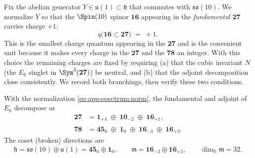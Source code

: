 Fix the abelian generator $Y\in\mathfrak u(1)\subset\mathfrak h$ that
commutes with $\mathfrak{so}(10)$. We normalize $Y$ so that the
$\Spin(10)$ spinor $\mathbf{16}$ appearing in the \emph{fundamental}
$\mathbf{27}$ carries charge $+1$:
\begin{equation}
  q\bigl(\mathbf{16}\subset\mathbf{27}\bigr) \;=\; +1 .
  \label{eq:app-spectrum:norm}
\end{equation}
This is the smallest charge quantum appearing in the $\mathbf{27}$ and
is the convenient unit because it makes every charge in the
$\mathbf{27}$ and the $\mathbf{78}$ an integer. With this choice the
remaining charges are fixed by requiring (a) that the cubic invariant
$N$ (the $E_6$ singlet in $\Sym^3(\mathbf{27})$) be neutral, and (b)
that the adjoint decomposition close consistently. We record both
branchings, then verify these two conditions.

\begin{theorem}[Branchings under $H=\Spin(10)\times U(1)$]
\label{thm:app-spectrum:branchings}
With the normalization \eqref{eq:app-spectrum:norm}, the fundamental and
adjoint of $E_6$ decompose as
\begin{align}
  \mathbf{27}
    &= \mathbf{1}_{+4}\;\oplus\;\mathbf{10}_{-2}\;\oplus\;\mathbf{16}_{+1},
    \label{eq:app-spectrum:27}\\[2pt]
  \mathbf{78}
    &= \mathbf{45}_{0}\;\oplus\;\mathbf{1}_{0}\;\oplus\;
       \mathbf{16}_{-3}\;\oplus\;\overline{\mathbf{16}}_{+3}.
    \label{eq:app-spectrum:78}
\end{align}
The coset (broken) directions are
\begin{equation}
  \mathfrak h = \mathfrak{so}(10)\oplus\mathfrak u(1)
     = \mathbf{45}_{0}\oplus\mathbf{1}_{0},
  \qquad
  \mathfrak m = \mathbf{16}_{-3}\oplus\overline{\mathbf{16}}_{+3},
  \qquad \dim_{\mathbb R}\mathfrak m = 32 .
  \label{eq:app-spectrum:hm}
\end{equation}
\end{theorem}

